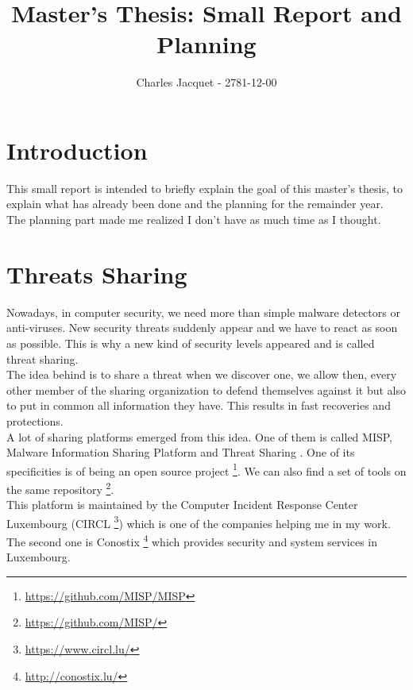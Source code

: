 \documentclass[10pt]{article}
\title{Master's Thesis: Small Report and Planning}
\author{Charles Jacquet - 2781-12-00}
\begin{document}
\maketitle

\section{Introduction}
This small report is intended to briefly explain the goal of this master's thesis, to explain what has already been done and the planning for the remainder year.\\
The planning part made me realized I don't have as much time as I thought.\\

\section{Threats Sharing}
Nowadays, in computer security, we need more than simple malware detectors or anti-viruses. New security threats suddenly appear and we have to react as soon as possible. This is why a new kind of security levels appeared and is called threat sharing.\\
The idea behind is to share a threat when we discover one, we allow then, every other member of the sharing organization to defend themselves against it but also to put in common all information they have. This results in fast recoveries and protections.\\

A lot of sharing platforms emerged from this idea. One of them is called MISP, Malware Information Sharing Platform and Threat Sharing \cite{wagner2016misp}. One of its specificities is of being an open source project \footnote{\url{https://github.com/MISP/MISP}}. We can also find a set of tools on the same repository \footnote{\url{https://github.com/MISP/}}. \\
This platform is maintained by the Computer Incident Response Center Luxembourg (CIRCL \footnote{\url{https://www.circl.lu/}}) which is one of the companies helping me in my work. The second one is Conostix \footnote{\url{http://conostix.lu/}} which provides security and system services in Luxembourg.
\end{document}
